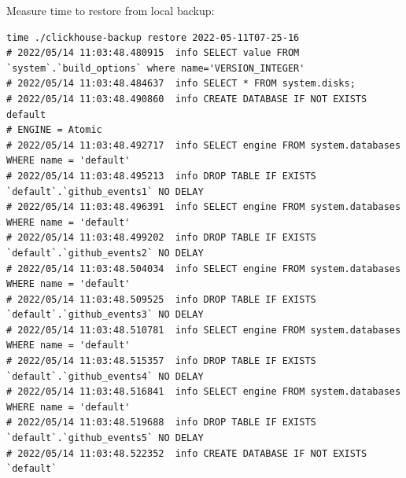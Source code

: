 Measure time to restore from local backup:
\begin{verbatim}
time ./clickhouse-backup restore 2022-05-11T07-25-16
# 2022/05/14 11:03:48.480915  info SELECT value FROM `system`.`build_options` where name='VERSION_INTEGER'
# 2022/05/14 11:03:48.484637  info SELECT * FROM system.disks;
# 2022/05/14 11:03:48.490860  info CREATE DATABASE IF NOT EXISTS default
# ENGINE = Atomic
# 2022/05/14 11:03:48.492717  info SELECT engine FROM system.databases WHERE name = 'default'
# 2022/05/14 11:03:48.495213  info DROP TABLE IF EXISTS `default`.`github_events1` NO DELAY
# 2022/05/14 11:03:48.496391  info SELECT engine FROM system.databases WHERE name = 'default'
# 2022/05/14 11:03:48.499202  info DROP TABLE IF EXISTS `default`.`github_events2` NO DELAY
# 2022/05/14 11:03:48.504034  info SELECT engine FROM system.databases WHERE name = 'default'
# 2022/05/14 11:03:48.509525  info DROP TABLE IF EXISTS `default`.`github_events3` NO DELAY
# 2022/05/14 11:03:48.510781  info SELECT engine FROM system.databases WHERE name = 'default'
# 2022/05/14 11:03:48.515357  info DROP TABLE IF EXISTS `default`.`github_events4` NO DELAY
# 2022/05/14 11:03:48.516841  info SELECT engine FROM system.databases WHERE name = 'default'
# 2022/05/14 11:03:48.519688  info DROP TABLE IF EXISTS `default`.`github_events5` NO DELAY
# 2022/05/14 11:03:48.522352  info CREATE DATABASE IF NOT EXISTS `default`

\end{verbatim}
